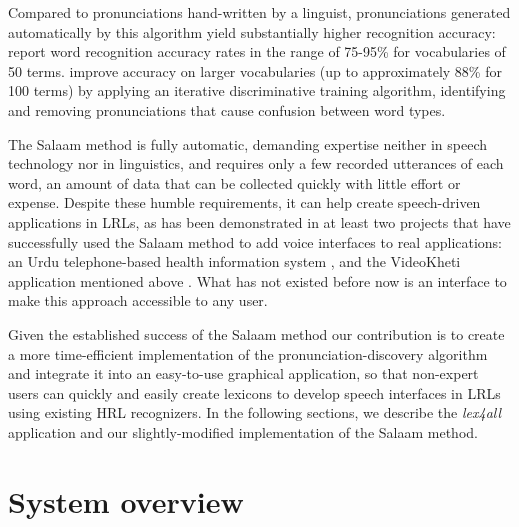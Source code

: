 \documentclass[11pt]{article}
\begin{document}
Compared to pronunciations hand-written by a linguist, pronunciations generated automatically by this algorithm yield substantially higher recognition accuracy: %
 report word recognition accuracy rates in the range of 75-95\% for vocabularies of 50 terms.
 improve accuracy on larger vocabularies (up to approximately 88\% for 100 terms) by applying an iterative discriminative training algorithm, identifying and removing pronunciations that cause confusion between word types.

The Salaam method is fully automatic, demanding expertise neither in speech technology 
nor in linguistics,
and requires only a few recorded utterances of each word,
an amount of data that can be collected quickly with little effort or expense. 
Despite these humble requirements, it 
can help create speech-driven applications in LRLs, as has been demonstrated in at least two projects that have successfully used the Salaam method to add voice interfaces to real applications: an Urdu telephone-based health information system \cite{Sherwani09}, and
the VideoKheti application mentioned above \cite{bali13}.
What has not existed before now is an interface to make this approach accessible to any user.

Given the established success of the Salaam method 
our contribution is to create a more time-efficient implementation of the pronunciation-discovery algorithm and integrate it into an easy-to-use graphical application, so that non-expert users can quickly and easily create lexicons to develop speech interfaces in LRLs using existing HRL recognizers. In the following sections, we describe the \textit{lex4all} application and our slightly-modified implementation of the Salaam method.


\section{System overview}
\label{sec:overview}
\end{document}
